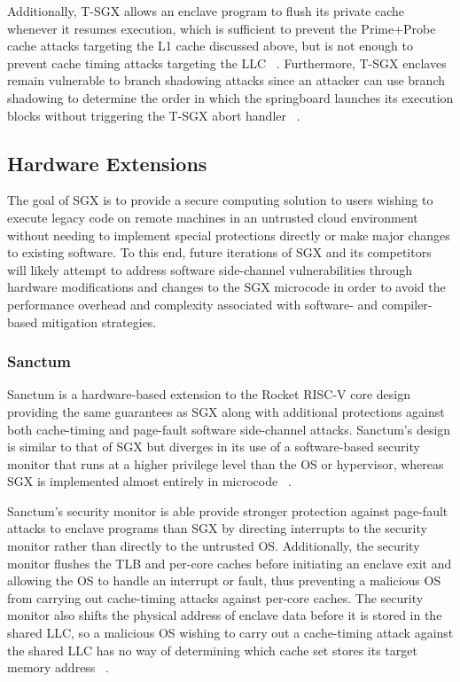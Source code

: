 Additionally, T-SGX allows an enclave program to flush its private cache whenever it resumes execution, which is sufficient to prevent the Prime+Probe cache attacks targeting the L1 cache discussed above, but is not enough to prevent cache timing attacks targeting the LLC ~\cite{shih_t-sgx:_2017}. Furthermore, T-SGX enclaves remain vulnerable to branch shadowing attacks since an attacker can use branch shadowing to determine the order in which the springboard launches its execution blocks without triggering the T-SGX abort handler ~\cite{lee_inferring_2017}.

\subsection{Hardware Extensions}

The goal of SGX is to provide a secure computing solution to users wishing to execute legacy code on remote machines in an untrusted cloud environment without needing to implement special protections directly or make major changes to existing software. To this end, future iterations of SGX and its competitors will likely attempt to address software side-channel vulnerabilities through hardware modifications and changes to the SGX microcode in order to avoid the performance overhead and complexity associated with software- and compiler-based mitigation strategies. 

\subsubsection{Sanctum}

Sanctum is a hardware-based extension to the Rocket RISC-V core design providing the same guarantees as SGX along with additional protections against both cache-timing and page-fault software side-channel attacks. Sanctum's design is similar to that of SGX but diverges in its use of a software-based security monitor that runs at a higher privilege level than the OS or hypervisor, whereas SGX is implemented almost entirely in microcode ~\cite{intel_corporation_intel_2016, costan_intel_2016, costan_sanctum:_2016, costan_sanctum:_2015}. 

Sanctum's security monitor is able provide stronger protection against page-fault attacks to enclave programs than SGX by directing interrupts to the security monitor rather than directly to the untrusted OS. Additionally, the security monitor flushes the TLB and per-core caches before initiating an enclave exit and allowing the OS to handle an interrupt or fault, thus preventing a malicious OS from carrying out cache-timing attacks against per-core caches. The security monitor also shifts the physical address of enclave data before it is stored in the shared LLC, so a malicious OS wishing to carry out a cache-timing attack against the shared LLC has no way of determining which cache set stores its target memory address ~\cite{costan_sanctum:_2016, costan_sanctum:_2015}.

